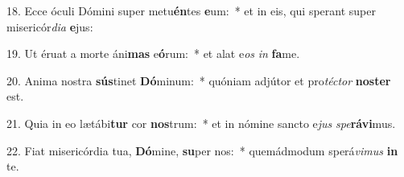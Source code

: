 18. Ecce óculi Dómini super metu\textbf{én}tes \textbf{e}um:~*  et in eis, qui sperant super misericór\textit{di}\textit{a} \textbf{e}jus:\

19. Ut éruat a morte áni\textbf{mas} e\textbf{ó}rum:~*  et alat e\textit{os} \textit{in} \textbf{fa}me.\

20. Anima nostra \textbf{sús}tinet \textbf{Dó}minum:~*  quóniam adjútor et pro\textit{téc}\textit{tor} \textbf{nos}\textbf{ter} est.\

21. Quia in eo lætábi\textbf{tur} cor \textbf{nos}trum:~*  et in nómine sancto e\textit{jus} \textit{spe}\textbf{rá}\textbf{vi}mus.\

22. Fiat misericórdia tua, \textbf{Dó}mine, \textbf{su}per nos:~*  quemádmodum sperá\textit{vi}\textit{mus} \textbf{in} te.\

